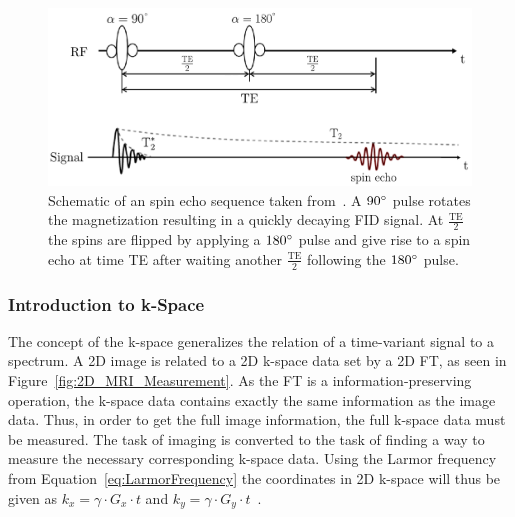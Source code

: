 \begin{figure}[h] %
	\centering
	\includegraphics[width=\linewidth]{./Images/SpinEcho.pdf} 
	\caption{Schematic of an spin echo sequence taken from~\cite{PulseSequences}. A $90 \degree$ pulse rotates the magnetization resulting in a quickly decaying FID signal. At $\frac{\text{TE}}{2}$ the spins are flipped by applying a $180 \degree$ pulse and give rise to a spin echo at time TE after waiting another $\frac{\text{TE}}{2}$ following the $180 \degree$ pulse.}
	\label{fig:SpinEcho}
\end{figure}


\subsubsection{Introduction to k-Space}
The concept of the k-space generalizes the relation of a time-variant signal to a spectrum. A 2D image is related to a 2D k-space data set by a 2D FT, as seen in Figure~\ref{fig:2D_MRI_Measurement}. As the FT is a information-preserving operation, the k-space data contains exactly the same information as the image data. Thus, in order to get the full image information, the full k-space data must be measured. The task of imaging is converted to the task of finding a way to measure the necessary corresponding k-space data. Using the Larmor frequency from Equation~\ref{eq:LarmorFrequency} the coordinates in 2D k-space will thus be given as $k_x = \gamma \cdot G_x \cdot t$ and $k_y = \gamma \cdot G_y \cdot t$~\cite{SamplingStrategies}. 

